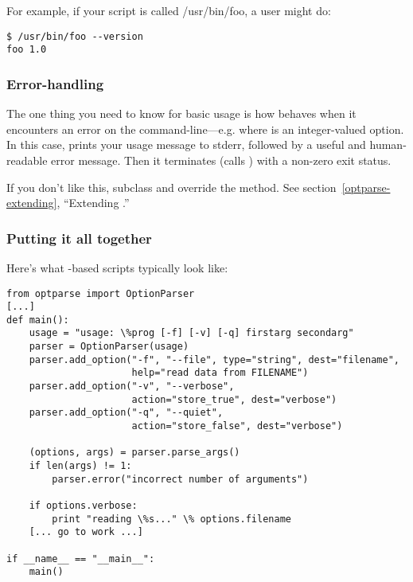 For example, if your script is called /usr/bin/foo, a user might do:

\begin{verbatim}
$ /usr/bin/foo --version
foo 1.0
\end{verbatim} %

\subsubsection{Error-handling\label{optparse-error-handling}}

The one thing you need to know for basic usage is how
 behaves when it encounters an error on the
command-line---e.g.  where  is an
integer-valued option.  In this case,  prints your
usage message to stderr, followed by a useful and human-readable error
message.  Then it terminates (calls ) with a
non-zero exit status.

If you don't like this, subclass  and override the
 method.  See section~\ref{optparse-extending},
``Extending .''

\subsubsection{Putting it all together\label{optparse-basic-summary}}

Here's what -based scripts typically look like:

\begin{verbatim}
from optparse import OptionParser
[...]
def main():
    usage = "usage: \%prog [-f] [-v] [-q] firstarg secondarg"
    parser = OptionParser(usage)
    parser.add_option("-f", "--file", type="string", dest="filename",
                      help="read data from FILENAME")
    parser.add_option("-v", "--verbose",
                      action="store_true", dest="verbose")
    parser.add_option("-q", "--quiet",
                      action="store_false", dest="verbose")

    (options, args) = parser.parse_args()
    if len(args) != 1:
        parser.error("incorrect number of arguments")

    if options.verbose:
        print "reading \%s..." \% options.filename
    [... go to work ...]

if __name__ == "__main__":
    main()
\end{verbatim}

